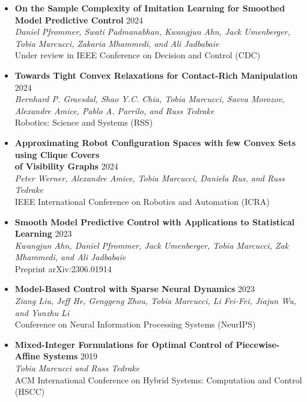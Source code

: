 \documentclass[11pt,a4paper,sans]{moderncv}
\begin{document}
\vspace{5pt}

\begin{itemize}

\item \textbf{On the Sample Complexity of Imitation Learning for Smoothed Model Predictive Control} \hfill 2024 \\
\textit{Daniel Pfrommer, Swati Padmanabhan, Kwangjun Ahn, Jack Umenberger, Tobia Marcucci, Zakaria Mhammedi, and Ali Jadbabaie} \\
Under review in IEEE Conference on Decision and Control (CDC)

\item \textbf{Towards Tight Convex Relaxations for Contact-Rich Manipulation} \hfill 2024 \\
\textit{Bernhard P. Graesdal, Shao Y.C. Chia, Tobia Marcucci, Savva Morozov, Alexandre Amice, Pablo A. Parrilo, and Russ Tedrake} \\
Robotics: Science and Systems (RSS)

\item \textbf{Approximating Robot Configuration Spaces with few Convex Sets using Clique Covers \\ of Visibility Graphs} \hfill 2024 \\
\textit{Peter Werner, Alexandre Amice, Tobia Marcucci, Daniela Rus, and Russ Tedrake} \\
IEEE International Conference on Robotics and Automation (ICRA)

\item \textbf{Smooth Model Predictive Control with Applications to Statistical Learning} \hfill 2023 \\
\textit{Kwangjun Ahn, Daniel Pfrommer, Jack Umenberger, Tobia Marcucci, Zak Mhammedi, and Ali Jadbabaie} \\
Preprint arXiv:2306.01914

\item \textbf{Model-Based Control with Sparse Neural Dynamics} \hfill 2023 \\
\textit{Ziang Liu, Jeff He, Genggeng Zhou, Tobia Marcucci, Li Fei-Fei, Jiajun Wu, and Yunzhu Li} \\
Conference on Neural Information Processing Systems (NeurIPS)

\item \textbf{Mixed-Integer Formulations for Optimal Control of Piecewise-Affine Systems} \hfill 2019 \\
\textit{Tobia Marcucci and Russ Tedrake} \\
ACM International Conference on Hybrid Systems: Computation and Control (HSCC)


\end{itemize}
\end{document}
